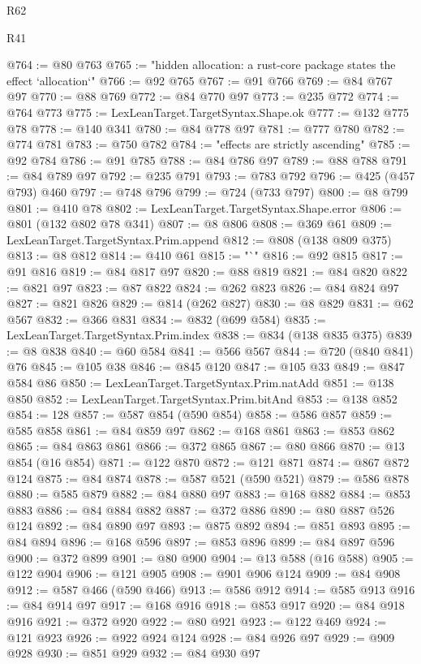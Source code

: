 \begin{lexlean}{R62}
\begin{lexlean}{R41}
\begin{coremodule}
{{{{{{{{{{{{{{{{{{{{{{{{{{{{{{{{{{{{{{{{{{{{{{{{{{{{{{{{{{{{{{{{{{{{{{{{{{{{{{{{{{{{{{{@764 := @80 @763
@765 := "hidden allocation: a rust-core package states the effect `allocation`"
@766 := @92 @765
@767 := @91 @766
@769 := @84 @767 @97
@770 := @88 @769
@772 := @84 @770 @97
@773 := @235 @772
@774 := @764 @773
@775 := LexLeanTarget.TargetSyntax.Shape.ok
@777 := @132 @775 @78
@778 := @140 @341
@780 := @84 @778 @97
@781 := @777 @780
@782 := @774 @781
@783 := @750 @782
@784 := "effects are strictly ascending"
@785 := @92 @784
@786 := @91 @785
@788 := @84 @786 @97
@789 := @88 @788
@791 := @84 @789 @97
@792 := @235 @791
@793 := @783 @792
@796 := @425 (@457 @793) @460
@797 := @748 @796
@799 := @724 (@733 @797)
@800 := @8 @799
@801 := @410 @78
@802 := LexLeanTarget.TargetSyntax.Shape.error
@806 := @801 (@132 @802 @78 @341)
@807 := @8 @806
@808 := @369 @61
@809 := LexLeanTarget.TargetSyntax.Prim.append
@812 := @808 (@138 @809 @375)
@813 := @8 @812
@814 := @410 @61
@815 := "`"
@816 := @92 @815
@817 := @91 @816
@819 := @84 @817 @97
@820 := @88 @819
@821 := @84 @820
@822 := @821 @97
@823 := @87 @822
@824 := @262 @823
@826 := @84 @824 @97
@827 := @821 @826
@829 := @814 (@262 @827)
@830 := @8 @829
@831 := @62 @567
@832 := @366 @831
@834 := @832 (@699 @584)
@835 := LexLeanTarget.TargetSyntax.Prim.index
@838 := @834 (@138 @835 @375)
@839 := @8 @838
@840 := @60 @584
@841 := @566 @567
@844 := @720 (@840 @841) @76
@845 := @105 @38
@846 := @845 @120
@847 := @105 @33
@849 := @847 @584 @86
@850 := LexLeanTarget.TargetSyntax.Prim.natAdd
@851 := @138 @850
@852 := LexLeanTarget.TargetSyntax.Prim.bitAnd
@853 := @138 @852
@854 := 128
@857 := @587 @854 (@590 @854)
@858 := @586 @857
@859 := @585 @858
@861 := @84 @859 @97
@862 := @168 @861
@863 := @853 @862
@865 := @84 @863 @861
@866 := @372 @865
@867 := @80 @866
@870 := @13 @854 (@16 @854)
@871 := @122 @870
@872 := @121 @871
@874 := @867 @872 @124
@875 := @84 @874
@878 := @587 @521 (@590 @521)
@879 := @586 @878
@880 := @585 @879
@882 := @84 @880 @97
@883 := @168 @882
@884 := @853 @883
@886 := @84 @884 @882
@887 := @372 @886
@890 := @80 @887 @526 @124
@892 := @84 @890 @97
@893 := @875 @892
@894 := @851 @893
@895 := @84 @894
@896 := @168 @596
@897 := @853 @896
@899 := @84 @897 @596
@900 := @372 @899
@901 := @80 @900
@904 := @13 @588 (@16 @588)
@905 := @122 @904
@906 := @121 @905
@908 := @901 @906 @124
@909 := @84 @908
@912 := @587 @466 (@590 @466)
@913 := @586 @912
@914 := @585 @913
@916 := @84 @914 @97
@917 := @168 @916
@918 := @853 @917
@920 := @84 @918 @916
@921 := @372 @920
@922 := @80 @921
@923 := @122 @469
@924 := @121 @923
@926 := @922 @924 @124
@928 := @84 @926 @97
@929 := @909 @928
@930 := @851 @929
@932 := @84 @930 @97
}}}}}}}}}}}}}}}}}}}}}}}}}}}}}}}}}}}}}}}}}}}}}}}}}}}}}}}}}}}}}}}}}}}}}}}}}}}}}}}}}}}}}}}
\end{coremodule}
\end{lexlean}
\end{lexlean}
